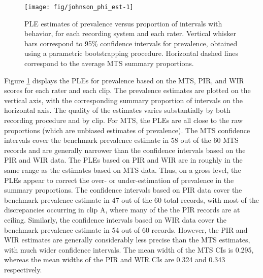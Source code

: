 \documentclass[man, noextraspace, floatsintext]{apa6}\usepackage[]{graphicx}\usepackage[]{color}
\newenvironment{knitrout}{}{} %
\begin{document}
\begin{knitrout}
\color{fgcolor}\begin{figure}[tb]

{\centering \texttt{[image: fig/johnson\_phi\_est-1]} 

}

\caption[PLE estimates of prevalence versus proportion of intervals with behavior, for each recording system and each rater]{PLE estimates of prevalence versus proportion of intervals with behavior, for each recording system and each rater. Vertical whisker bars correspond to 95\% confidence intervals for prevalence, obtained using a parametric bootstrapping procedure. Horizontal dashed lines correspond to the average MTS summary proportions.}\label{fig:johnson_phi_est}
\end{figure}


\end{knitrout}

Figure \ref{fig:johnson_phi_est} displays the PLEs for prevalence based on the MTS, PIR, and WIR scores for each rater and each clip. 
The prevalence estimates are plotted on the vertical axis, with the corresponding summary proportion of intervals on the horizontal axis. 
The quality of the estimates varies substantially by both recording procedure and by clip. 
For MTS, the PLEs are all close to the raw proportions (which are unbiased estimates of prevalence). 
The MTS confidence intervals cover the benchmark prevalence estimate in 58 out of the 60 MTS records and are generally narrower than the confidence intervals based on the PIR and WIR data.
The PLEs based on PIR and WIR are in roughly in the same range as the estimates based on MTS data. 
Thus, on a gross level, the PLEs appear to correct the over- or under-estimation of prevalence in the summary proportions. 
The confidence intervals based on PIR data cover the benchmark prevalence estimate in 47 out of the 60 total records, with most of the discrepancies occurring in clip A, where many of the the PIR records are at ceiling. 
Similarly, the confidence intervals based on WIR data cover the benchmark prevalence estimate in 54 out of 60 records. 
However, the PIR and WIR estimates are generally considerably less precise than the MTS estimates, with much wider confidence intervals. The mean width of the MTS CIs is 0.295, whereas the mean widths of the PIR and WIR CIs are 0.324 and 0.343 respectively.
\end{document}
